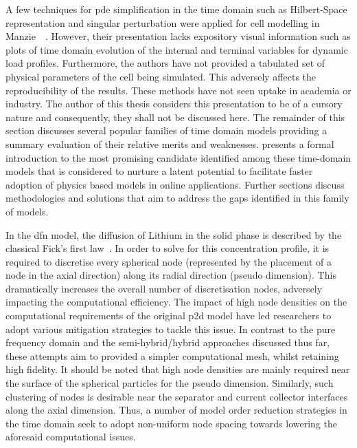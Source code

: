 A  few techniques  for  \gls{pde}  simplification in  the  time  domain such  as
Hilbert-Space  representation and  singular perturbation  were applied  for cell
modelling in  Manzie~\etal~\cite{Manzie2015}. However, their  presentation lacks
expository visual  information such  as plots  of time  domain evolution  of the
internal  and terminal  variables for  dynamic load  profiles. Furthermore,  the
authors have  not provided a  tabulated set of  physical parameters of  the cell
being  simulated. This  adversely affects  the reproducibility  of the  results.
These methods have not  seen uptake in academia or industry.  The author of this
thesis considers this  presentation to be of a cursory  nature and consequently,
they  shall not  be  discussed here.  The remainder  of  this section  discusses
several popular families of time domain models providing a summary evaluation of
their  relative merits  and  weaknesses.   presents a  formal
introduction to the most promising  candidate identified among these time-domain
models that  is considered to  nurture a  latent potential to  facilitate faster
adoption  of  physics based  models  in  online applications.  Further  sections
discuss methodologies and  solutions that aim to address the  gaps identified in
this family of models. 


In the \gls{dfn} model, the diffusion of Lithium in the solid phase is described
by the  classical Fick's first law~\cite{Fick1995}.  In order to solve  for this
concentration  profile,  it  is  required to  discretise  every  spherical  node
(represented by the placement of a node in the axial direction) along its radial
direction (pseudo dimension). This dramatically  increases the overall number of
discretisation  nodes, adversely  impacting  the  computational efficiency.  The
impact of high node densities on  the computational requirements of the original
\gls{p2d}  model have  led researchers  to adopt  various mitigation  strategies
to  tackle  this  issue. In  contrast  to  the  pure  frequency domain  and  the
semi-hybrid/hybrid approaches discussed thus far, these attempts aim to provided
a simpler computational mesh, whilst retaining high fidelity. It should be noted
that high node  densities are mainly required near the  surface of the spherical
particles for the pseudo   dimension. Similarly, such clustering
of nodes is desirable near the  separator and current collector interfaces along
the axial dimension.
Thus, a number  of model order reduction  strategies in the time  domain seek to
adopt  non-uniform node  spacing  towards lowering  the aforesaid  computational
issues.



